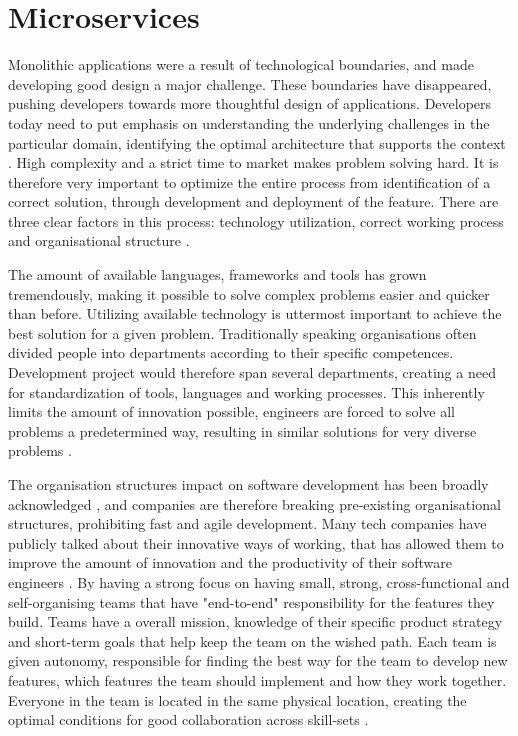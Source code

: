 \section{Microservices}
Monolithic applications were a result of technological boundaries, and made developing good design a major challenge. These boundaries have disappeared, pushing developers towards more thoughtful design of applications. Developers today need to put emphasis on understanding the underlying challenges in the particular domain, identifying the optimal architecture that supports the context \cite[t.~17:00]{evans2016tackling}. High complexity and a strict time to market makes problem solving hard. It is therefore very important to optimize the entire process from identification of a correct solution, through development and deployment of the feature. There are three clear factors in this process: technology utilization, correct working process and organisational structure \cite[t.~12:16]{george2016it} \cite[preface]{newman2015microservices}. 

The amount of available languages, frameworks and tools has grown tremendously, making it possible to solve complex problems easier and quicker than before. Utilizing available technology is uttermost important to achieve the best solution for a given problem. Traditionally speaking organisations often divided people into departments according to their specific competences. Development project would therefore span several departments, creating a need for standardization of tools, languages and working processes. This inherently limits the amount of innovation possible, engineers are forced to solve all problems a predetermined way, resulting in similar solutions for very diverse problems \cite[t.~14:20]{fowler2014microservicesoamonolith} \cite[00:30]{kniberg2014spotify} \cite{murer2015fifteen} \cite[17:00]{meshenberg2016microservices}. 

The organisation structures impact on software development has been broadly acknowledged \cite{fowler2014microservices, newman2014demystifying}, and companies are therefore breaking pre-existing organisational structures, prohibiting fast and agile development. Many tech companies have publicly talked about their innovative ways of working, that has allowed them to improve the amount of innovation and the productivity of their software engineers \cite[00:30]{kniberg2014spotify} \cite[16:00]{meshenberg2016microservices}. By having a strong focus on having small, strong, cross-functional and self-organising teams that have "end-to-end" responsibility for the features they build. Teams have a overall mission, knowledge of their specific product strategy and short-term goals that help keep the team on the wished path. Each team is given autonomy, responsible for finding the best way for the team to develop new features, which features the team should implement and how they work together. Everyone in the team is located in the same physical location, creating the optimal conditions for good collaboration across skill-sets \cite[01:00]{kniberg2014spotify} \cite{gray2006conversation}.

